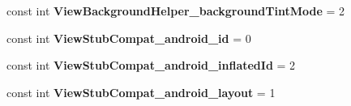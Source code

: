 \begin{DoxyCompactItemize}
const int {\bfseries View\+Background\+Helper\+\_\+background\+Tint\+Mode} = 2
\item 
\mbox{\label{classXaria_1_1Resource_1_1Styleable_a4563cfb10e87911ff21aadc58562afb3}} 
const int {\bfseries View\+Stub\+Compat\+\_\+android\+\_\+id} = 0
\item 
\mbox{\label{classXaria_1_1Resource_1_1Styleable_ab3b296065d0bd4f600beebe5bc2cab3a}} 
const int {\bfseries View\+Stub\+Compat\+\_\+android\+\_\+inflated\+Id} = 2
\item 
\mbox{\label{classXaria_1_1Resource_1_1Styleable_a8675d7d22ea3ad234dca7d7af642b379}} 
const int {\bfseries View\+Stub\+Compat\+\_\+android\+\_\+layout} = 1
\end{DoxyCompactItemize}

